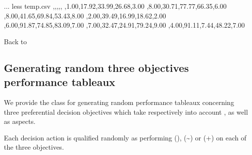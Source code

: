 \documentclass[a4paper,12pt,english]{sphinxhowto}
\begin{document}
\begin{sphinxVerbatim}[commandchars=\\\{\},numbers=left,firstnumber=1,stepnumber=1]
...\PYGZdl{} less temp.csv
 ,,,,,
 ,1.00,\PYGZhy{}17.92,\PYGZhy{}33.99,26.68,3.00
 ,8.00,\PYGZhy{}30.71,\PYGZhy{}77.77,66.35,6.00
 ,8.00,\PYGZhy{}41.65,\PYGZhy{}69.84,53.43,8.00
 ,2.00,\PYGZhy{}39.49,\PYGZhy{}16.99,18.62,2.00
 ,6.00,\PYGZhy{}91.87,\PYGZhy{}74.85,83.09,7.00
 ,7.00,\PYGZhy{}32.47,\PYGZhy{}24.91,79.24,9.00
 ,4.00,\PYGZhy{}91.11,\PYGZhy{}7.44,48.22,7.00
\end{sphinxVerbatim}

Back to {\hyperref[\detokenize{tutorial:tutorial-label}]{}}


\subsection{Generating random three objectives performance tableaux}
\label{\detokenize{tutorial:generating-random-three-objectives-performance-tableaux}}
We provide the  class for generating random performance tableaux concerning three preferential decision objectives which take respectively into account ,  as well as  aspects.

Each decision action is qualified randomly as performing  (\sphinxhyphen{}),  (\textasciitilde{}) or  (+) on each of the three objectives.
\end{document}
